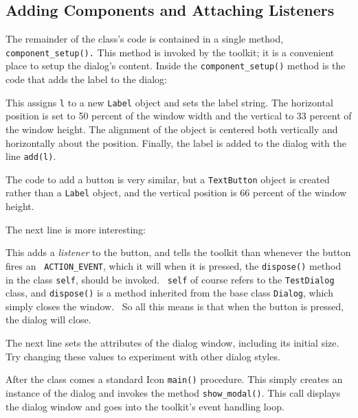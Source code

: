 \subsection*{Adding Components and Attaching Listeners}

The remainder of the class's code is contained in a single method,
\texttt{component\_setup().} This method is invoked by the toolkit; it
is a convenient place to setup the dialog's content.
Inside the \texttt{component\_setup()} method is the code that adds
the label to the dialog:


\noindent This assigns \texttt{l} to a new \texttt{Label} object
and sets the label string. The horizontal position is set to 50 percent of
the window width and the vertical to 33 percent of the window height.
The alignment of the object is centered both vertically and
horizontally about the position. Finally, the label is added to the
dialog with the line \texttt{add(l)}.

The code to add a button is very similar, but a \texttt{TextButton}
object is created rather than a \texttt{Label} object, and the vertical
position is 66 percent of the window height. 

The next line is more interesting:


\noindent This adds a \textit{listener} to the button, and tells the toolkit
than whenever the button fires an \ \texttt{ACTION\_EVENT}, which it will
when it is pressed, the \texttt{dispose()} method in the class
\texttt{self}, should be invoked. \ \texttt{self} of course refers to
the \texttt{TestDialog} class, and \texttt{dispose()} is a method
inherited from the base class \texttt{Dialog}, which simply closes the
window. \ So all this means is that when the button is pressed, the
dialog will close.

The next line sets the attributes of the dialog window, including its
initial size. Try changing these values to experiment with other dialog
styles.


After the class comes a standard Icon \texttt{main()} procedure. This
simply creates an instance of the dialog and invokes the method
\texttt{show\_modal()}.
This call displays the dialog window and goes into the
toolkit's event handling loop. 

